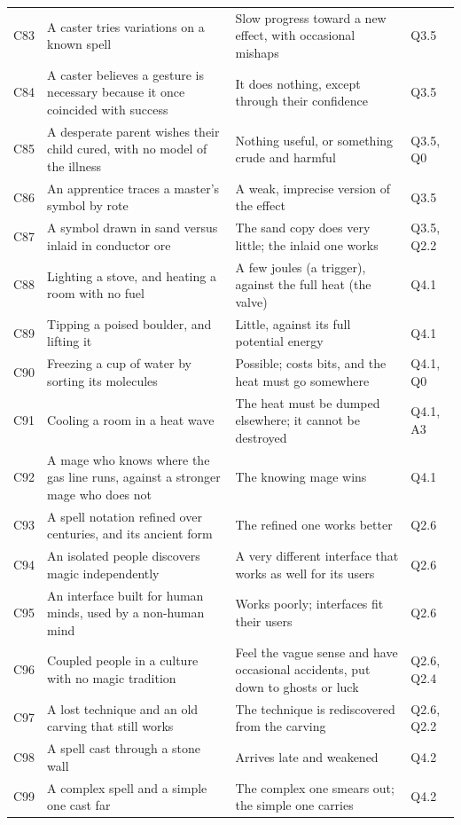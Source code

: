 \begin{longtable}{@{}>{\raggedright\arraybackslash}p{}>{\raggedright\arraybackslash}p{}>{\raggedright\arraybackslash}p{}>{\raggedright\arraybackslash}p{}@{}}
C83 & A caster tries variations on a known spell & Slow progress toward a new effect, with occasional mishaps & Q3.5\\
C84 & A caster believes a gesture is necessary because it once coincided with success & It does nothing, except through their confidence & Q3.5\\
C85 & A desperate parent wishes their child cured, with no model of the illness & Nothing useful, or something crude and harmful & Q3.5, Q0\\
C86 & An apprentice traces a master's symbol by rote & A weak, imprecise version of the effect & Q3.5\\
C87 & A symbol drawn in sand versus inlaid in conductor ore & The sand copy does very little; the inlaid one works & Q3.5, Q2.2\\
C88 & Lighting a stove, and heating a room with no fuel & A few joules (a trigger), against the full heat (the valve) & Q4.1\\
C89 & Tipping a poised boulder, and lifting it & Little, against its full potential energy & Q4.1\\
C90 & Freezing a cup of water by sorting its molecules & Possible; costs bits, and the heat must go somewhere & Q4.1, Q0\\
C91 & Cooling a room in a heat wave & The heat must be dumped elsewhere; it cannot be destroyed & Q4.1, A3\\
C92 & A mage who knows where the gas line runs, against a stronger mage who does not & The knowing mage wins & Q4.1\\
C93 & A spell notation refined over centuries, and its ancient form & The refined one works better & Q2.6\\
C94 & An isolated people discovers magic independently & A very different interface that works as well for its users & Q2.6\\
C95 & An interface built for human minds, used by a non-human mind & Works poorly; interfaces fit their users & Q2.6\\
C96 & Coupled people in a culture with no magic tradition & Feel the vague sense and have occasional accidents, put down to ghosts or luck & Q2.6, Q2.4\\
C97 & A lost technique and an old carving that still works & The technique is rediscovered from the carving & Q2.6, Q2.2\\
C98 & A spell cast through a stone wall & Arrives late and weakened & Q4.2\\
C99 & A complex spell and a simple one cast far & The complex one smears out; the simple one carries & Q4.2\\

\end{longtable}
